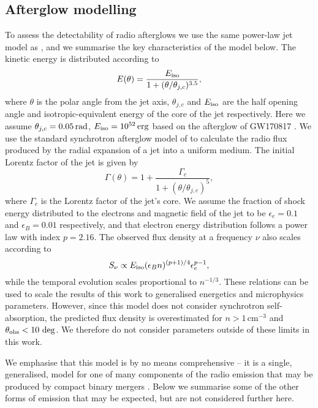 \subsection{Afterglow modelling}
\label{subsec:afterglow_modelling}
To assess the detectability of radio afterglows we use the same power-law jet model as \citet{2020MNRAS.494.2449D}, and we summarise the key characteristics of the model below. The kinetic energy is distributed according to
\begin{equation}
E(\theta) = \frac{E_{\rm iso}}{1+(\theta/\theta_{j,c})^{3.5}},
\end{equation}
where $\theta$ is the polar angle from the jet axis, $\theta_{j,c}$ and $E_{\rm iso}$ are the half opening angle and isotropic-equivalent energy of the core of the jet respectively. Here we assume $\theta_{j,c}=0.05\,{\rm rad}$, $E_{\rm iso}=10^{52}\,{\rm erg}$ based on the afterglow of GW170817 \citep{2020arXiv200602382M,2020arXiv200601150T}. We use the standard synchrotron afterglow model of \citet{1998ApJ...497L..17S} to calculate the radio flux produced by the radial expansion of a jet into a uniform medium. The initial Lorentz factor of the jet is given by
\begin{equation}
\Gamma(\theta) = 1+\frac{\Gamma_{c}}{1+(\theta/\theta_{j,c})^5},
\end{equation}
where $\Gamma_c$ is the Lorentz factor of the jet's core. We assume the fraction of shock energy distributed to the electrons and magnetic field of the jet to be $\epsilon_e=0.1$ and $\epsilon_B=0.01$ respectively, and that electron energy distribution follows a power law with index $p=2.16$. The observed flux density at a frequency $\nu$ also scales according to 
\begin{equation}
    \label{eq:flux_scaling}
    S_\nu \propto E_{\rm iso}(\epsilon_{B}n)^{(p+1)/4}\epsilon_{e}^{p-1},
\end{equation}
while the temporal evolution scales proportional to $n^{-1/3}$. These relations can be used to scale the results of this work to generalised energetics and microphysics parameters. However, since this model does not consider synchrotron self-absorption, the predicted flux density is overestimated for $n>1$\,cm$^{-3}$ and $\theta_{\rm obs} < 10\,\deg$. We therefore do not consider parameters outside of these limits in this work.

We emphasise that this model is by no means comprehensive -- it is a single, generalised, model for one of many components of the radio emission that may be produced by compact binary mergers \citep[e.g., see][]{2015MNRAS.450.1430H}. Below we summarise some of the other forms of emission that may be expected, but are not considered further here.

